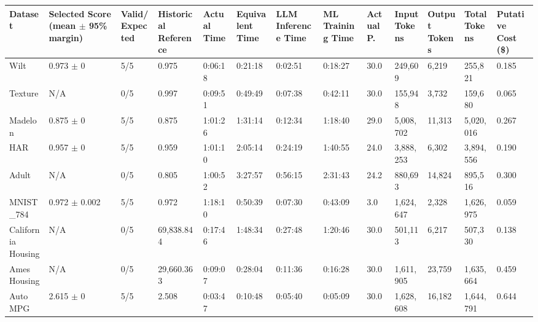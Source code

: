 \begin{tabular}{lllllllllllll}
\hline
Dataset & Selected Score (mean \ensuremath{\pm} 95\% margin) & Valid/Expected & Historical Reference & Actual Time & Equivalent Time & LLM Inference Time & ML Training Time & Actual P. & Input Tokens & Output Tokens & Total Tokens & Putative Cost (\$) \\
\hline
Wilt & 0.973 \ensuremath{\pm} 0 & 5/5 & 0.975 & 0:06:18 & 0:21:18 & 0:02:51 & 0:18:27 & 30.0 & 249,609 & 6,219 & 255,821 & 0.185 \\
Texture & N/A & 0/5 & 0.997 & 0:09:51 & 0:49:49 & 0:07:38 & 0:42:11 & 30.0 & 155,948 & 3,732 & 159,680 & 0.065 \\
Madelon & 0.875 \ensuremath{\pm} 0 & 5/5 & 0.875 & 1:01:26 & 1:31:14 & 0:12:34 & 1:18:40 & 29.0 & 5,008,702 & 11,313 & 5,020,016 & 0.267 \\
HAR & 0.957 \ensuremath{\pm} 0 & 5/5 & 0.959 & 1:01:10 & 2:05:14 & 0:24:19 & 1:40:55 & 24.0 & 3,888,253 & 6,302 & 3,894,556 & 0.190 \\
Adult & N/A & 0/5 & 0.805 & 1:00:52 & 3:27:57 & 0:56:15 & 2:31:43 & 24.2 & 880,693 & 14,824 & 895,516 & 0.300 \\
MNIST\_784 & 0.972 \ensuremath{\pm} 0.002 & 5/5 & 0.972 & 1:18:10 & 0:50:39 & 0:07:30 & 0:43:09 & 3.0 & 1,624,647 & 2,328 & 1,626,975 & 0.059 \\
California Housing & N/A & 0/5 & 69,838.844 & 0:17:46 & 1:48:34 & 0:27:48 & 1:20:46 & 30.0 & 501,113 & 6,217 & 507,330 & 0.138 \\
Ames Housing & N/A & 0/5 & 29,660.363 & 0:09:07 & 0:28:04 & 0:11:36 & 0:16:28 & 30.0 & 1,611,905 & 23,759 & 1,635,664 & 0.459 \\
Auto MPG & 2.615 \ensuremath{\pm} 0 & 5/5 & 2.508 & 0:03:47 & 0:10:48 & 0:05:40 & 0:05:09 & 30.0 & 1,628,608 & 16,182 & 1,644,791 & 0.644 \\
\hline
\end{tabular}

